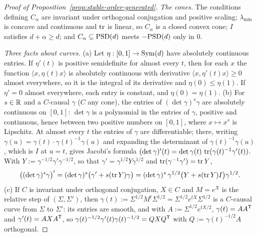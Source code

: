 \begin{proof}[Proof of Proposition~\ref{prop:stable-order-generated}]
\emph{The cones.} The conditions defining $C_\alpha$ are invariant under orthogonal conjugation and positive
scaling; $\lambda_{\min}$ is concave and continuous and $\operatorname{tr}$ is linear, so $C_\alpha$ is a closed convex
cone; $I$ satisfies $d + \alpha \ge d$; and $C_\alpha \subseteq \mathrm{PSD}(d)$ meets $-\mathrm{PSD}(d)$ only in $0$.

\emph{Three facts about curves.} (a) Let $\eta : [0,1] \to \mathrm{Sym}(d)$ have absolutely continuous entries. If
$\eta'(t)$ is positive semidefinite for almost every $t$, then for each $x$ the function $\langle x,
\eta(t)x\rangle$ is absolutely continuous with derivative $\langle x, \eta'(t)x\rangle \ge 0$ almost
everywhere, so it is the integral of its derivative and $\eta(0) \le \eta(1)$. If $\eta' = 0$ almost
everywhere, each entry is constant, and $\eta(0) = \eta(1)$. (b) For $s \in \mathbb{R}$ and a $C$-causal $\gamma$
($C$ any cone), the entries of $(\det\gamma)^s\gamma$ are absolutely continuous on $[0,1]$: $\det\gamma$ is a
polynomial in the entries of $\gamma$, positive and continuous, hence between two positive numbers on
$[0,1]$, where $x \mapsto x^s$ is Lipschitz. At almost every $t$ the entries of $\gamma$ are differentiable;
there, writing $\gamma(u) = \gamma(t)\cdot\gamma(t)^{-1}\gamma(u)$ and expanding the determinant of
$\gamma(t)^{-1}\gamma(u)$, which is $I$ at $u = t$, gives Jacobi's formula $(\det\gamma)'(t) =
\det\gamma(t)\,\operatorname{tr}(\gamma(t)^{-1}\gamma'(t))$. With $Y := \gamma^{-1/2}\gamma'\gamma^{-1/2}$, so that
$\gamma' = \gamma^{1/2}Y\gamma^{1/2}$ and $\operatorname{tr}(\gamma^{-1}\gamma') = \operatorname{tr} Y$,
\[
  \bigl((\det\gamma)^s\gamma\bigr)' = (\det\gamma)^s\bigl(\gamma' + s(\operatorname{tr} Y)\gamma\bigr)
  = (\det\gamma)^s\,\gamma^{1/2}\bigl(Y + s(\operatorname{tr} Y)I\bigr)\gamma^{1/2} .
\]
(c) If $C$ is invariant under orthogonal conjugation, $X \in C$ and $M = e^X$ is the relative step of
$(\Sigma, \Sigma')$, then $\gamma(t) := \Sigma^{1/2}M^t\Sigma^{1/2} = \Sigma^{1/2}e^{tX}\Sigma^{1/2}$ is a
$C$-causal curve from $\Sigma$ to $\Sigma'$: its entries are smooth, and with $A := \Sigma^{1/2}e^{tX/2}$,
$\gamma(t) = AA^{\mathsf{T}}$ and $\gamma'(t) = AXA^{\mathsf{T}}$, so $\gamma(t)^{-1/2}\gamma'(t)\gamma(t)^{-1/2} =
QXQ^{\mathsf{T}}$ with $Q := \gamma(t)^{-1/2}A$ orthogonal.


\end{proof}
